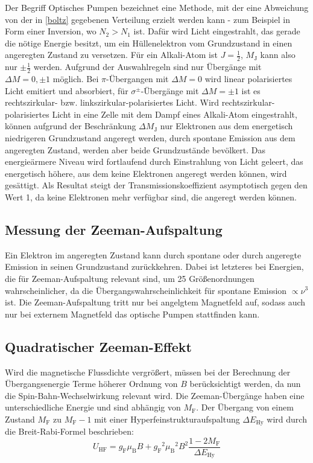 Der Begriff Optisches Pumpen bezeichnet eine Methode, mit der eine Abweichung von der in \autoref{boltz} gegebenen
Verteilung erzielt werden kann - zum Beispiel in Form einer Inversion, wo $N_2 > N_1$ ist.
Dafür wird Licht eingestrahlt, das gerade die nötige Energie besitzt, um ein Hüllenelektron vom Grundzustand in einen
angeregten Zustand zu versetzen. Für ein Alkali-Atom ist $J=\frac{1}{2}$, $M_\text{J}$ kann also nur $\pm \frac{1}{2}$
werden. Aufgrund der Auswahlregeln sind nur Übergänge mit $\Delta M = 0,\pm 1$ möglich.
Bei $\pi$-Übergangen mit $\Delta M = 0$ wird linear polarisiertes Licht emitiert und absorbiert, für $\sigma^\pm$-Übergänge
mit $\Delta M = \pm 1$ ist es rechtszirkular- bzw. linkszirkular-polarisiertes Licht.
Wird rechtszirkular-polarisiertes Licht in eine Zelle mit dem Dampf eines Alkali-Atom eingestrahlt, können aufgrund der
Beschränkung $\Delta M_\text{J}$ nur Elektronen aus dem energetisch niedrigeren Grundzustand angeregt werden, durch spontane
Emission aus dem angeregten Zustand, werden aber beide Grundzustände bevölkert. Das energieärmere Niveau wird fortlaufend
durch Einstrahlung von Licht geleert, das energetisch höhere, aus dem keine Elektronen angeregt werden können, wird gesättigt.
Als Resultat steigt der Transmissionskoeffizient asymptotisch gegen den Wert 1, da keine Elektronen mehr verfügbar sind, die
angeregt werden können.

\subsection{Messung der Zeeman-Aufspaltung}

Ein Elektron im angeregten Zustand kann durch spontane oder durch angeregte Emission in seinen Grundzustand zurückkehren.
Dabei ist letzteres bei Energien, die für Zeeman-Aufspaltung relevant sind, um 25 Größenordnungen wahrscheinlicher, da die
Übergangswahrscheinlichkeit für spontane Emission $\propto \nu^3$ ist.
Die Zeeman-Aufspaltung tritt nur bei angelgtem Magnetfeld auf, sodass auch nur bei externem Magnetfeld das optische Pumpen
stattfinden kann.

\subsection{Quadratischer Zeeman-Effekt}

Wird die magnetische Flussdichte vergrößert, müssen bei der Berechnung der Übergangsenergie Terme höherer Ordnung von $B$
berücksichtigt werden, da nun die Spin-Bahn-Wechselwirkung relevant wird. Die Zeeman-Übergänge haben eine unterschiedliche
Energie und sind abhängig von $M_\text{F}$. Der Übergang von einem Zustand $M_\text{F}$ zu $M_\text{F}-1$ mit einer
Hyperfeinstrukturaufspaltung $\Delta E_\text{Hy}$ wird durch die Breit-Rabi-Formel beschrieben:
\begin{equation}
  U_\text{HF} = g_\text{F}\mu_\text{B}B + {g_\text{F}}^2{\mu_\text{B}}^2B^2\frac{1-2M_\text{F}}{\Delta E_\text{Hy}}
\end{equation}
